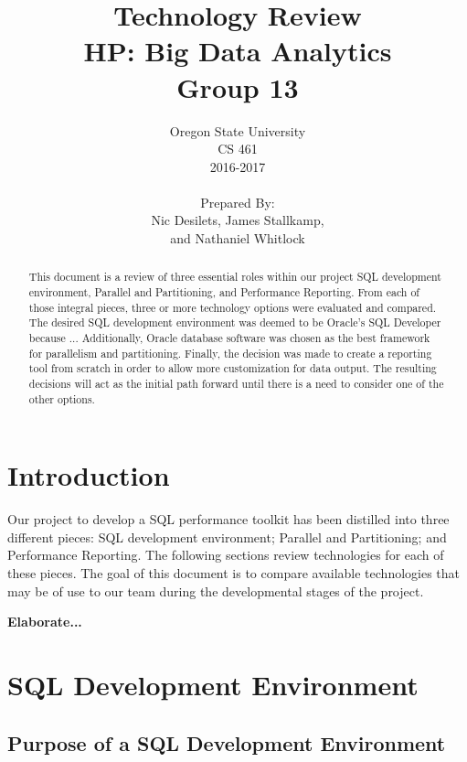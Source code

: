 \documentclass[draftclsnofoot, onecolumn, compsoc, 10pt]{IEEEtran}
\title{\Huge Technology Review\\\large HP: Big Data Analytics\\Group 13}
\author{Oregon State University\\CS 461\\2016-2017\\\\Prepared By:\\Nic Desilets, James Stallkamp,\\and Nathaniel Whitlock}
\begin{document}
\begin{titlingpage}
    \maketitle 
    
    \vspace{1in}
    \begin{abstract}
		\noindent This document is a review of three essential roles within our project SQL development environment, Parallel and Partitioning, and Performance Reporting.
        From each of those integral pieces, three or more technology options were evaluated and compared.
        The desired SQL development environment was deemed to be Oracle's SQL Developer because ...
        Additionally, Oracle database software was chosen as the best framework for parallelism and partitioning.
        Finally, the decision was made to create a reporting tool from scratch in order to allow more customization for data output.
        The resulting decisions will act as the initial path forward until there is a need to consider one of the other options.
    \end{abstract}
\end{titlingpage}

\tableofcontents
\pagebreak

\section{Introduction}
Our project to develop a SQL performance toolkit has been distilled into three different pieces: SQL development environment; Parallel and Partitioning; and Performance Reporting. The following sections review technologies for each of these pieces. The goal of this document is to compare available technologies that may be of use to our team during the developmental stages of the project.


\textbf{Elaborate...}


\section{SQL Development Environment}

\subsection{Purpose of a SQL Development Environment}
\end{document}

